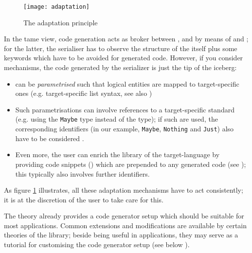 \begin{isabellebody}
\begin{isamarkuptext}
  \begin{figure}[here]
    \texttt{[image: adaptation]}
    \caption{The adaptation principle}
    \label{fig:adaptation}
  \end{figure}

  \noindent In the tame view, code generation acts as broker between
  ,  and  by means of  and ; for the latter, the serialiser has to observe the
  structure of the  itself plus some 
  keywords which have to be avoided for generated code.  However, if
  you consider  mechanisms, the code generated by
  the serializer is just the tip of the iceberg:

  \begin{itemize}

    \item {} can be \emph{parametrised} such that
      logical entities are mapped to target-specific ones
      (e.g. target-specific list syntax, see also
      )

    \item Such parametrisations can involve references to a
      target-specific standard  (e.g. using the  \verb|Maybe| type instead of the 
       type); if such are used, the corresponding
      identifiers (in our example, \verb|Maybe|, \verb|Nothing| and \verb|Just|) also have to be considered .

    \item Even more, the user can enrich the library of the
      target-language by providing code snippets () which are prepended to any generated code (see
      ); this typically also involves further
       identifiers.

  \end{itemize}

  \noindent As figure \ref{fig:adaptation} illustrates, all these
  adaptation mechanisms have to act consistently; it is at the
  discretion of the user to take care for this.%
\end{isamarkuptext}%
\isamarkuptrue%
%
\isamarkuptrue%
%
\begin{isamarkuptext}%
The \hyperlink{theory.HOL}{\mbox{}} \hyperlink{theory.Main}{\mbox{}} theory already provides a code
  generator setup which should be suitable for most applications.
  Common extensions and modifications are available by certain
  theories of the  library; beside being useful in
  applications, they may serve as a tutorial for customising the code
  generator setup (see below ).


\end{isamarkuptext}
\end{isabellebody}
